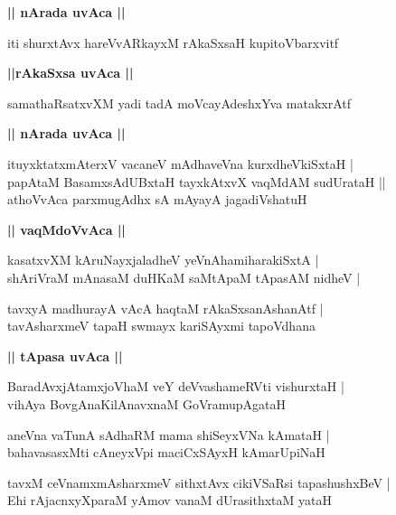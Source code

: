 \documentclass[twoside,12pt,openright]{book}
\newcounter{shloka}[chapter]
\def\uvaca#1{\centerline{{\large\textbf{#1}}}}
\begin{document}
\uvaca{|| nArada uvAca ||}

\begin{shloka}%
iti shurxtAvx hareVvARkayxM rAkaSxsaH kupitoVbarxvitf 
\end{shloka}

\uvaca{||rAkaSxsa uvAca ||}

\begin{shloka}%
samathaRsatxvXM yadi tadA moVcayAdeshxYva matakxrAtf 
\end{shloka}

\uvaca{|| nArada uvAca ||}

\begin{shloka}%
ituyxktatxmAterxV vacaneV mAdhaveVna kurxdheVkiSxtaH |\\
papAtaM BasamxsAdUBxtaH tayxkAtxvX vaqMdAM sudUrataH ||\\
athoVvAca parxmugAdhx sA mAyayA jagadiVshatuH 
\end{shloka}

\uvaca{|| vaqMdoVvAca ||}

\begin{shloka}%
kasatxvXM kAruNayxjaladheV yeVnAhamiharakiSxtA |\\
shAriVraM mAnasaM duHKaM saMtApaM tApasAM nidheV |
\end{shloka}

\begin{shloka}%
tavxyA madhurayA vAcA haqtaM rAkaSxsanAshanAtf |\\
tavAsharxmeV tapaH swmayx kariSAyxmi tapoVdhana 
\end{shloka}

\uvaca{|| tApasa uvAca ||}

\begin{shloka}%
BaradAvxjAtamxjoVhaM veY deVvashameRVti vishurxtaH |\\
vihAya BovgAnaKilAnavxnaM GoVramupAgataH 
\end{shloka}

\begin{shloka}%
aneVna vaTunA sAdhaRM mama shiSeyxVNa kAmataH |\\
bahavasasxMti cAneyxVpi maciCxSAyxH kAmarUpiNaH
\end{shloka}

\begin{shloka}%
tavxM ceVnamxmAsharxmeV sithxtAvx cikiVSaRsi tapashushxBeV |\\
Ehi rAjacnxyXparaM yAmov vanaM dUrasithxtaM yataH 
\end{shloka}
\end{document}
